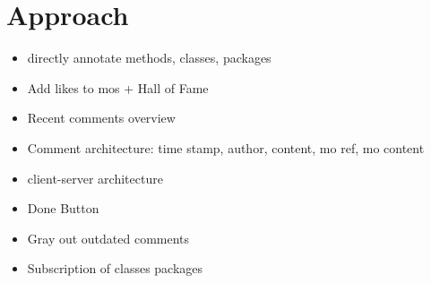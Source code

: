 
\section{Approach}

\begin{itemize}
	\item directly annotate methods, classes, packages
	\item Add likes to mos + Hall of Fame
	\item Recent comments overview
	\item Comment architecture: time stamp, author, content, mo ref, mo content
	\item client-server architecture
	\item Done Button
	\item Gray out outdated comments
	\item Subscription of classes packages
\end{itemize}
